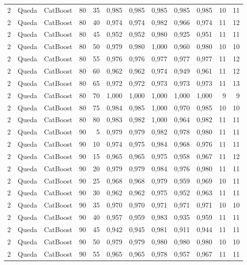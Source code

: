 \begin{longtable}{@{}rllrrrrrrrrr@{}}
2 & Queda & CatBoost & 80 & 35 & 0,985 & 0,985 & 0,985 & 0,985 & 0,985 & 10 & 11 \\
2 & Queda & CatBoost & 80 & 40 & 0,974 & 0,974 & 0,982 & 0,966 & 0,974 & 11 & 12 \\
2 & Queda & CatBoost & 80 & 45 & 0,952 & 0,952 & 0,980 & 0,925 & 0,951 & 11 & 11 \\
2 & Queda & CatBoost & 80 & 50 & 0,979 & 0,980 & 1,000 & 0,960 & 0,980 & 10 & 10 \\
2 & Queda & CatBoost & 80 & 55 & 0,976 & 0,976 & 0,977 & 0,977 & 0,977 & 11 & 12 \\
2 & Queda & CatBoost & 80 & 60 & 0,962 & 0,962 & 0,974 & 0,949 & 0,961 & 11 & 12 \\
2 & Queda & CatBoost & 80 & 65 & 0,972 & 0,972 & 0,973 & 0,973 & 0,973 & 11 & 13 \\
2 & Queda & CatBoost & 80 & 70 & 1,000 & 1,000 & 1,000 & 1,000 & 1,000 & 9 & 9 \\
2 & Queda & CatBoost & 80 & 75 & 0,984 & 0,985 & 1,000 & 0,970 & 0,985 & 10 & 10 \\
2 & Queda & CatBoost & 80 & 80 & 0,983 & 0,982 & 1,000 & 0,964 & 0,982 & 11 & 11 \\
2 & Queda & CatBoost & 90 & 5 & 0,979 & 0,979 & 0,982 & 0,978 & 0,980 & 11 & 11 \\
2 & Queda & CatBoost & 90 & 10 & 0,974 & 0,975 & 0,984 & 0,968 & 0,976 & 11 & 11 \\
2 & Queda & CatBoost & 90 & 15 & 0,965 & 0,965 & 0,975 & 0,958 & 0,967 & 11 & 12 \\
2 & Queda & CatBoost & 90 & 20 & 0,979 & 0,979 & 0,984 & 0,976 & 0,980 & 11 & 11 \\
2 & Queda & CatBoost & 90 & 25 & 0,968 & 0,968 & 0,979 & 0,959 & 0,969 & 10 & 11 \\
2 & Queda & CatBoost & 90 & 30 & 0,962 & 0,962 & 0,975 & 0,952 & 0,963 & 11 & 11 \\
2 & Queda & CatBoost & 90 & 35 & 0,970 & 0,970 & 0,971 & 0,971 & 0,971 & 10 & 10 \\
2 & Queda & CatBoost & 90 & 40 & 0,957 & 0,959 & 0,983 & 0,935 & 0,959 & 11 & 11 \\
2 & Queda & CatBoost & 90 & 45 & 0,942 & 0,945 & 0,981 & 0,911 & 0,944 & 11 & 11 \\
2 & Queda & CatBoost & 90 & 50 & 0,979 & 0,979 & 0,980 & 0,980 & 0,980 & 10 & 10 \\
2 & Queda & CatBoost & 90 & 55 & 0,965 & 0,965 & 0,978 & 0,957 & 0,967 & 11 & 11 \\

\end{longtable}
